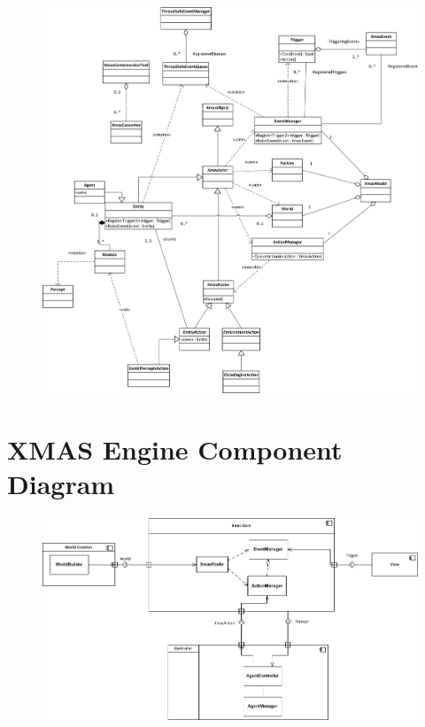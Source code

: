 \documentclass[10pt,twoside]{book}                  %
\begin{document}
\begin{figure}[H]
\begin{centering}
\includegraphics[width=1.2\columnwidth]{xmas_domain_model_uml}
\par\end{centering}

\caption{\label{fig:DomainModelDiagramXMAS}}
\end{figure}



\chapter{XMAS Engine Component Diagram\label{chap:ComponentDiagramAppendix}}

\begin{figure}
\includegraphics[angle=270,width=1\textwidth]{componentDiagram}

\caption{}


\end{figure}
\end{document}
